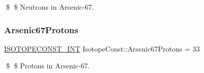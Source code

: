\$ \$ Neutrons in Arsenic-\/67. \mbox{\label{group___isotope_const-_arsenic-_as67_gaa54abc0d0df768e6e73d94b8d709f975}} 
\subsubsection{\texorpdfstring{Arsenic67\+Protons}{Arsenic67Protons}}
{\footnotesize\ttfamily \mbox{\hyperlink{group___isotope_const-_macros_ga5f18360b3e99483a35c32d789e62621c}{I\+S\+O\+T\+O\+P\+E\+C\+O\+N\+S\+T\+\_\+\+I\+NT}} Isotope\+Const\+::\+Arsenic67\+Protons = 33}

\$ \$ Protons in Arsenic-\/67. 